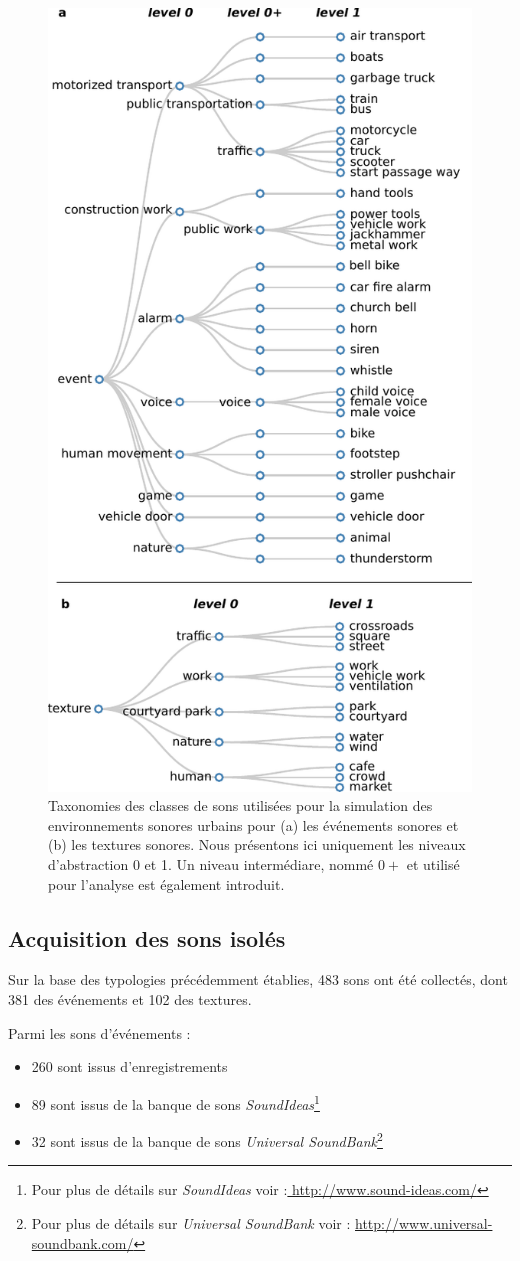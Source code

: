 \begin{figure}[bth]
        \myfloatalign
        \includegraphics[width=.5\linewidth]{gfxHierarchy/taxonomy}
       \caption[Taxonomies des classes de sons utilisées pour la simulation des environnements sonores urbains]{Taxonomies des classes de sons utilisées pour la simulation des environnements sonores urbains pour (a) les événements sonores et (b) les textures sonores. Nous présentons ici uniquement les niveaux d'abstraction 0 et 1. Un niveau intermédiare, nommé $0+$ et utilisé pour l'analyse est également introduit.}\label{fig:taxonomie}
\end{figure}

\subsection{Acquisition des sons isolés}

Sur la base des typologies précédemment établies,  483 sons ont été collectés, dont 381 des événements et 102 des textures.

Parmi les sons d'événements :

\begin{itemize}
\item 260 sont issus d’enregistrements
\item 89 sont issus de la banque de sons \emph{SoundIdeas}\footnote{Pour plus de détails sur \emph{SoundIdeas} voir :\url{ http://www.sound-ideas.com/}}
\item 32 sont issus de la banque de sons \emph{Universal SoundBank}\footnote{Pour plus de détails sur \emph{Universal SoundBank} voir : \url{http://www.universal-soundbank.com/}}
\end{itemize}

